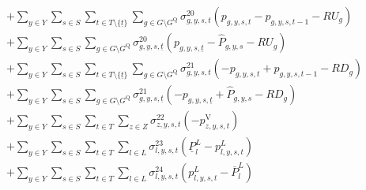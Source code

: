 \documentclass{article}
\newcommand{\sGenerators}{G}
\newcommand{\sStorage}{G^{\mathrm{Q}}}
\newcommand{\sYears}{Y}
\newcommand{\sScenarios}{S}
\newcommand{\sIntervals}{T}
\newcommand{\sZones}{Z}
\newcommand{\sLinks}{L}
\newcommand{\iGenerator}{g}
\newcommand{\iYear}{y}
\newcommand{\iScenario}{s}
\newcommand{\iInterval}{t}
\newcommand{\iIntervalStart}{\underline{\iInterval}}
\newcommand{\iZone}{z}
\newcommand{\iLink}{l}
\newcommand{\cRampRateUp}[1][\iGenerator]{RU_{#1}}
\newcommand{\cRampRateDown}[1][\iGenerator]{RD_{#1}}
\newcommand{\cPowerFlowMin}{\underline{P}_{\iLink}^{L}}
\newcommand{\cPowerFlowMax}{\overline{P}_{\iLink}^{L}}
\newcommand{\cPowerInitial}[1][\iGenerator,\iYear,\iScenario]{\hat{P}_{#1}}
\newcommand{\vPower}[1][\iGenerator,\iYear,\iScenario,\iInterval]{p_{#1}}
\newcommand{\vPowerFlow}[1][\iLink,\iYear,\iScenario,\iInterval]{p^{\sLinks}_{#1}}
\newcommand{\vLostLoadPower}[1][\iZone,\iYear,\iScenario,\iInterval]{p^{\mathrm{V}}_{#1}}
\newcommand{\dRampRateUp}[1][\iGenerator,\iYear,\iScenario,\iInterval]{\sigma_{#1}^{20}}
\newcommand{\dRampRateDown}[1][\iGenerator,\iYear,\iScenario,\iInterval]{\sigma_{#1}^{21}}
\newcommand{\dNonNegativeLostLoad}[1][\iZone,\iYear,\iScenario,\iInterval]{\sigma_{#1}^{22}}
\newcommand{\dMinPowerFlow}[1][\iLink,\iYear,\iScenario,\iInterval]{\sigma_{#1}^{23}}
\newcommand{\dMaxPowerFlow}[1][\iLink,\iYear,\iScenario,\iInterval]{\sigma_{#1}^{24}}
\begin{document}
\begin{align}
		& + \sum\limits_{\iYear \in \sYears}\sum\limits_{\iScenario \in \sScenarios}\sum\limits_{\iInterval \in \sIntervals \setminus \{\iIntervalStart\}} \sum\limits_{\iGenerator \in \sGenerators \setminus \sStorage} \dRampRateUp \left(\vPower - \vPower[\iGenerator,\iYear,\iScenario,\iInterval-1] - \cRampRateUp\right)\\
		& + \sum\limits_{\iYear \in \sYears}\sum\limits_{\iScenario \in \sScenarios} \sum\limits_{\iGenerator \in \sGenerators \setminus \sStorage} \dRampRateUp[\iGenerator,\iYear,\iScenario,\iIntervalStart] \left(\vPower[\iGenerator,\iYear,\iScenario,\iIntervalStart] - \cPowerInitial - \cRampRateUp\right)\\
		& + \sum\limits_{\iYear \in \sYears}\sum\limits_{\iScenario \in \sScenarios}\sum\limits_{\iInterval \in \sIntervals \setminus \{\iIntervalStart\}} \sum\limits_{\iGenerator \in \sGenerators \setminus \sStorage} \dRampRateDown \left(- \vPower + \vPower[\iGenerator,\iYear,\iScenario,\iInterval-1] - \cRampRateDown\right)\\
		& + \sum\limits_{\iYear \in \sYears}\sum\limits_{\iScenario \in \sScenarios} \sum\limits_{\iGenerator \in \sGenerators \setminus \sStorage} \dRampRateDown[\iGenerator,\iYear,\iScenario,\iIntervalStart] \left(- \vPower[\iGenerator,\iYear,\iScenario,\iIntervalStart] + \cPowerInitial - \cRampRateDown\right)\\
		& + \sum\limits_{\iYear \in \sYears}\sum\limits_{\iScenario \in \sScenarios}\sum\limits_{\iInterval \in \sIntervals} \sum\limits_{\iZone \in \sZones} \dNonNegativeLostLoad \left(- \vLostLoadPower\right)\\
		& + \sum\limits_{\iYear \in \sYears}\sum\limits_{\iScenario \in \sScenarios}\sum\limits_{\iInterval \in \sIntervals} \sum\limits_{\iLink \in \sLinks} \dMinPowerFlow \left(\cPowerFlowMin - \vPowerFlow\right)\\
		& + \sum\limits_{\iYear \in \sYears}\sum\limits_{\iScenario \in \sScenarios}\sum\limits_{\iInterval \in \sIntervals} \sum\limits_{\iLink \in \sLinks} \dMaxPowerFlow \left(\vPowerFlow - \cPowerFlowMax\right)\\
\end{align}
\end{document}
